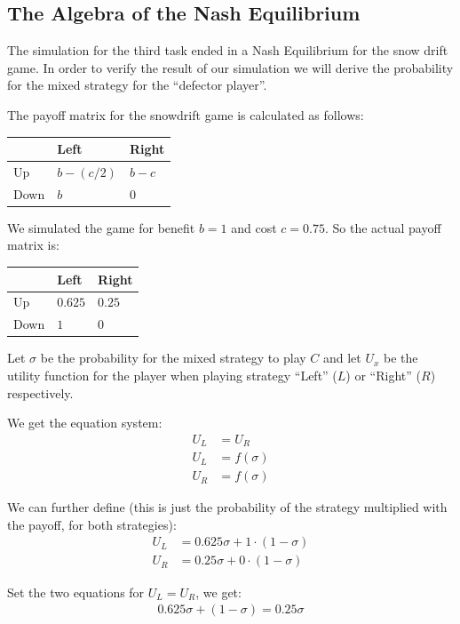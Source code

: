 \documentclass[DIV=calc, paper=a4, fontsize=11pt, twocolumn]{scrartcl}	 %
\begin{document}
\subsection*{The Algebra of the Nash Equilibrium}

The simulation for the third task ended in a Nash Equilibrium
for the snow drift game. In order to verify the result of our
simulation we will derive the probability for the mixed strategy
for the ``defector player''.


The payoff matrix for the snowdrift game is calculated as follows:

\begin{tabular}{l|ll}
  & Left & Right \\
\midrule
Up & $b-(c/2)$ & $b-c$ \\
Down & $b$ & $0$ \\
\end{tabular}

We simulated the game for benefit $b=1$ and cost $c=0.75$.
So the actual payoff matrix is:

\begin{tabular}{l|ll}
  & Left & Right \\
\midrule
Up & $0.625$ & $0.25$ \\
Down & $1$ & $0$ \\
\end{tabular}

Let $\sigma$ be the probability for the mixed strategy
to play $C$ and let $U_x$ be the utility function for the
player when playing strategy ``Left'' ($L$) or ``Right'' ($R$)
respectively.

We get the equation system:
\begin{align*}
  U_L &= U_R\\
  U_L &= f(\sigma)\\
  U_R &= f(\sigma)
\end{align*}

We can further define (this is just the probability
of the strategy multiplied with the payoff, for both
strategies):
\begin{align*}
  U_L &= 0.625\sigma + 1 \cdot (1-\sigma)\\
  U_R &= 0.25\sigma + 0 \cdot (1-\sigma)
\end{align*}

Set the two equations for $U_L = U_R$, we get:
\begin{align*}
0.625\sigma + (1-\sigma) =  0.25\sigma
\end{align*}
\end{document}
